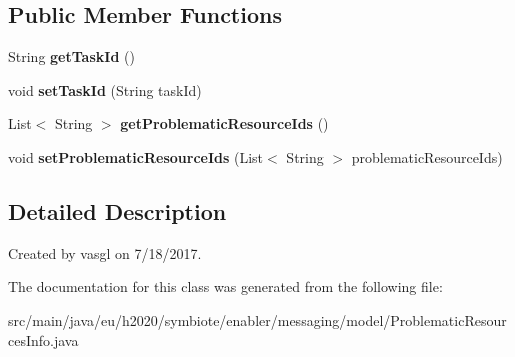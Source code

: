 \subsection*{Public Member Functions}
\begin{DoxyCompactItemize}
\item 
\mbox{\label{classeu_1_1h2020_1_1symbiote_1_1enabler_1_1messaging_1_1model_1_1ProblematicResourcesInfo_a92411e876b03bb80f6c71fa1ab5e8de5}} 
String {\bfseries get\+Task\+Id} ()
\item 
\mbox{\label{classeu_1_1h2020_1_1symbiote_1_1enabler_1_1messaging_1_1model_1_1ProblematicResourcesInfo_adbe8e5bf7713d5ca184e5d455275b46d}} 
void {\bfseries set\+Task\+Id} (String task\+Id)
\item 
\mbox{\label{classeu_1_1h2020_1_1symbiote_1_1enabler_1_1messaging_1_1model_1_1ProblematicResourcesInfo_a087bde675752b6fc46f1ec5af6a16776}} 
List$<$ String $>$ {\bfseries get\+Problematic\+Resource\+Ids} ()
\item 
\mbox{\label{classeu_1_1h2020_1_1symbiote_1_1enabler_1_1messaging_1_1model_1_1ProblematicResourcesInfo_ab6196531849d6ebf5768395a8b4b70b9}} 
void {\bfseries set\+Problematic\+Resource\+Ids} (List$<$ String $>$ problematic\+Resource\+Ids)
\end{DoxyCompactItemize}


\subsection{Detailed Description}
Created by vasgl on 7/18/2017. 

The documentation for this class was generated from the following file\+:\begin{DoxyCompactItemize}
\item 
src/main/java/eu/h2020/symbiote/enabler/messaging/model/Problematic\+Resources\+Info.\+java\end{DoxyCompactItemize}
